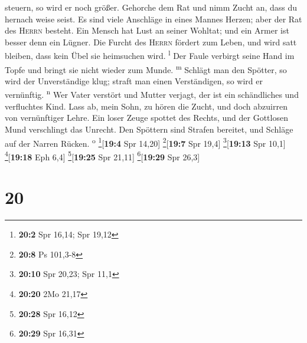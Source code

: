 steuern, so wird er noch größer.  Gehorche dem Rat und
nimm Zucht an, dass du hernach weise seist.  Es sind
viele Anschläge in eines Mannes Herzen; aber der Rat des \textsc{Herrn}
besteht.  Ein Mensch hat Lust an seiner Wohltat; und ein
Armer ist besser denn ein Lügner.  Die Furcht des
\textsc{Herrn} fördert zum Leben, und wird satt bleiben, dass kein Übel
sie heimsuchen wird. \textsuperscript{l}  Der Faule
verbirgt seine Hand im Topfe und bringt sie nicht wieder zum Munde.
\textsuperscript{m}  Schlägt man den Spötter, so wird der
Unverständige klug; straft man einen Verständigen, so wird er
vernünftig. \textsuperscript{n}  Wer Vater verstört und
Mutter verjagt, der ist ein schändliches und verfluchtes Kind.
 Lass ab, mein Sohn, zu hören die Zucht, und doch
abzuirren von vernünftiger Lehre.  Ein loser Zeuge
spottet des Rechts, und der Gottlosen Mund verschlingt das Unrecht.
 Den Spöttern sind Strafen bereitet, und Schläge auf der
Narren Rücken. \textsuperscript{o} \footnote{\textbf{20:2} Spr 16,14;
  Spr 19,12}{[}\textbf{19:4} Spr 14,20{]} \footnote{\textbf{20:8} Ps
  101,3-8}{[}\textbf{19:7} Spr 19,4{]} \footnote{\textbf{20:10} Spr
  20,23; Spr 11,1}{[}\textbf{19:13} Spr 10,1{]}
\footnote{\textbf{20:20} 2Mo 21,17}{[}\textbf{19:18} Eph 6,4{]}
\footnote{\textbf{20:28} Spr 16,12}{[}\textbf{19:25} Spr 21,11{]}
\footnote{\textbf{20:29} Spr 16,31}{[}\textbf{19:29} Spr 26,3{]}

\hypertarget{section-19}{%
\section{20}\label{section-19}}

